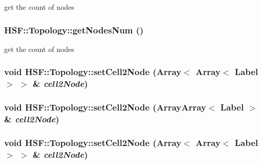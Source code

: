 get the count of nodes \hypertarget{classHSF_1_1Topology_a9a62513cf2963da4ab2bf58d46d6d9f7}{
\subsubsection[{getNodesNum}]{ HSF::Topology::getNodesNum ()}}
\label{classHSF_1_1Topology_a9a62513cf2963da4ab2bf58d46d6d9f7}


get the count of nodes \hypertarget{classHSF_1_1Topology_a947e781930ba1bbf355970af289e35ba}{
\subsubsection[{setCell2Node}]{\setlength{\rightskip}{0pt plus 5cm}void HSF::Topology::setCell2Node (Array$<$ Array$<$ {\bf Label} $>$ $>$ \& {\em cell2Node})}}
\label{classHSF_1_1Topology_a947e781930ba1bbf355970af289e35ba}
\hypertarget{classHSF_1_1Topology_a6a372d4d321126c3626c27f777753729}{
\subsubsection[{setCell2Node}]{\setlength{\rightskip}{0pt plus 5cm}void HSF::Topology::setCell2Node ({\bf ArrayArray}$<$ {\bf Label} $>$ \& {\em cell2Node})}}
\label{classHSF_1_1Topology_a6a372d4d321126c3626c27f777753729}
\hypertarget{classHSF_1_1Topology_a947e781930ba1bbf355970af289e35ba}{
\subsubsection[{setCell2Node}]{\setlength{\rightskip}{0pt plus 5cm}void HSF::Topology::setCell2Node (Array$<$ Array$<$ {\bf Label} $>$ $>$ \& {\em cell2Node})}}
